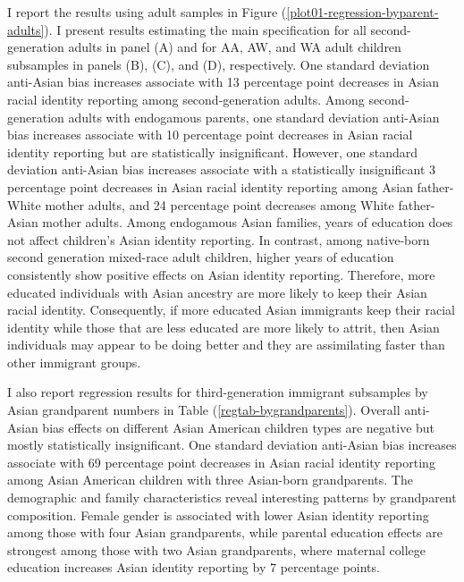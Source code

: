 I report the results using adult samples in Figure (\ref{plot01-regression-byparent-adults}). I present results estimating the main specification for all second-generation adults in panel (A) and for AA, AW, and WA adult children subsamples in panels (B), (C), and (D), respectively. One standard deviation anti-Asian bias increases associate with 13 percentage point decreases in Asian racial identity reporting among second-generation adults. Among second-generation adults with endogamous parents, one standard deviation anti-Asian bias increases associate with 10 percentage point decreases in Asian racial identity reporting but are statistically insignificant. However, one standard deviation anti-Asian bias increases associate with a statistically insignificant 3 percentage point decreases in Asian racial identity reporting among Asian father-White mother adults, and 24 percentage point decreases among White father-Asian mother adults. Among endogamous Asian families, years of education does not affect children's Asian identity reporting. In contrast, among native-born second generation mixed-race adult children, higher years of education consistently show positive effects on Asian identity reporting. Therefore, more educated individuals with Asian ancestry are more likely to keep their Asian racial identity. Consequently, if more educated Asian immigrants keep their racial identity while those that are less educated are more likely to attrit, then Asian individuals may appear to be doing better and they are assimilating faster than other immigrant groups.

I also report regression results for third-generation immigrant subsamples by Asian grandparent numbers in Table (\ref{regtab-bygrandparents}). Overall anti-Asian bias effects on different Asian American children types are negative but mostly statistically insignificant. One standard deviation anti-Asian bias increases associate with 69 percentage point decreases in Asian racial identity reporting among Asian American children with three Asian-born grandparents. The demographic and family characteristics reveal interesting patterns by grandparent composition. Female gender is associated with lower Asian identity reporting among those with four Asian grandparents, while parental education effects are strongest among those with two Asian grandparents, where maternal college education increases Asian identity reporting by 7 percentage points.

